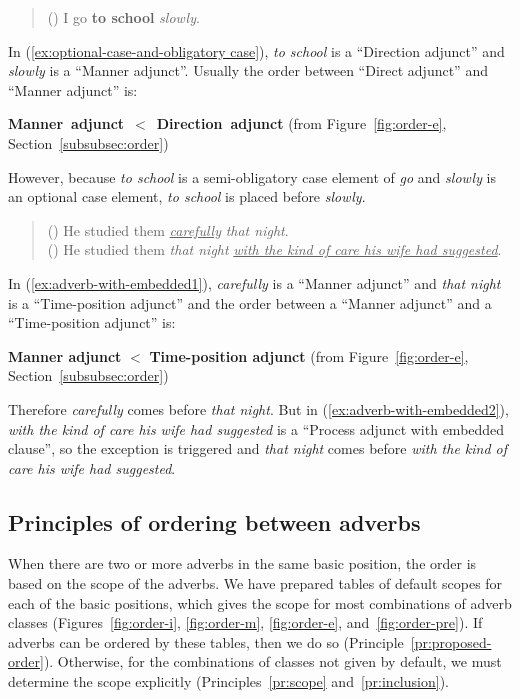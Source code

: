 \begin{quote}
 \small
 ()
 I go {\bf to school} {\em slowly}. 
\end{quote}

In (\ref{ex:optional-case-and-obligatory case}), {\em to school} is a
``Direction adjunct'' and {\em slowly} is a ``Manner adjunct''.
Usually the order between ``Direct adjunct'' and ``Manner adjunct'' is:
\begin{flushleft}
  {\bf Manner~adjunct}~$<$~{\bf Direction~adjunct} (from
  Figure~\ref{fig:order-e}, Section~\ref{subsubsec:order})
\end{flushleft}
However, because {\it to school\/} is a semi-obligatory case element
of {\it go\/} and {\it slowly\/} is an optional case element, {\it to
  school\/} is placed before {\it slowly}.

\smallskip
\begin{quote}
 \small
 ()
 He studied them \underline{\em carefully} {\em that night}. \\
 ()
 He studied them {\em that night} 
 \underline{\em with the kind of care his wife had suggested}. 
\end{quote}

In (\ref{ex:adverb-with-embedded1}), {\em carefully} is a ``Manner
adjunct'' and {\em that night} is a ``Time-position adjunct'' and the
order between a ``Manner adjunct'' and a ``Time-position adjunct'' is:
\begin{flushleft}
  {\bf Manner adjunct} $<$ {\bf Time-position adjunct} (from
  Figure~\ref{fig:order-e}, Section~\ref{subsubsec:order})
\end{flushleft}
Therefore {\em carefully} comes before {\em that night}.  But in
(\ref{ex:adverb-with-embedded2}), {\em with the kind of care his wife
  had suggested} is a ``Process adjunct with embedded clause'', so the
exception is triggered and {\em that night} comes before {\em with the
  kind of care his wife had suggested}.


\subsection{Principles of ordering between adverbs}

When there are two or more adverbs in the same basic position, the
order is based on the scope of the adverbs.  We have prepared tables
of default scopes for each of the basic positions, which gives the
scope for most combinations of adverb classes (Figures~\ref{fig:order-i},
\ref{fig:order-m}, \ref{fig:order-e}, and~\ref{fig:order-pre}).  If
adverbs can be ordered by these tables, then we do so
(Principle~\ref{pr:proposed-order}).  Otherwise, for the combinations
of classes not given by default, we must determine the scope explicitly
(Principles~\ref{pr:scope} and~\ref{pr:inclusion}).


